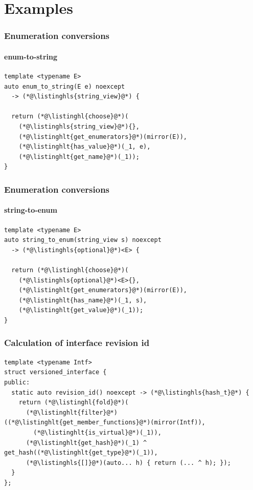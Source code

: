 \documentclass[aspectratio=169,compress,table,xcolor=table]{beamer}
\begin{document}
\section{Examples}
\begin{frame}[fragile]
  \frametitle{Enumeration conversions}
  \framesubtitle{enum-to-string}
  \begin{lstlisting}[language=c++2x]
template <typename E>
auto enum_to_string(E e) noexcept
  -> (*@\listinghls{string_view}@*) {

  return (*@\listinghl{choose}@*)(
    (*@\listinghls{string_view}@*){},
    (*@\listinghlt{get_enumerators}@*)(mirror(E)),
    (*@\listinghlt{has_value}@*)(_1, e),
    (*@\listinghlt{get_name}@*)(_1));
}
  \end{lstlisting}
\end{frame}
\begin{frame}[fragile]
  \frametitle{Enumeration conversions}
  \framesubtitle{string-to-enum}
  \begin{lstlisting}[language=c++2x]
template <typename E>
auto string_to_enum(string_view s) noexcept
  -> (*@\listinghls{optional}@*)<E> {

  return (*@\listinghl{choose}@*)(
    (*@\listinghls{optional}@*)<E>{},
    (*@\listinghlt{get_enumerators}@*)(mirror(E)),
    (*@\listinghlt{has_name}@*)(_1, s),
    (*@\listinghlt{get_value}@*)(_1));
}
  \end{lstlisting}
\end{frame}
\begin{frame}[fragile]
  \frametitle{Calculation of interface revision id}
  \begin{lstlisting}[language=c++2x,basicstyle=\small\ttfamily]
template <typename Intf>
struct versioned_interface {
public:
  static auto revision_id() noexcept -> (*@\listinghls{hash_t}@*) {
    return (*@\listinghl{fold}@*)(
      (*@\listinghlt{filter}@*)((*@\listinghlt{get_member_functions}@*)(mirror(Intf)),
        (*@\listinghlt{is_virtual}@*)(_1)),
      (*@\listinghlt{get_hash}@*)(_1) ^ get_hash((*@\listinghlt{get_type}@*)(_1)),
      (*@\listinghls{[]}@*)(auto... h) { return (... ^ h); });
  }
};
  \end{lstlisting}
\end{frame}
\end{document}

